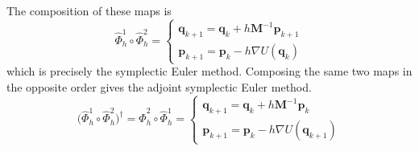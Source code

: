 \documentclass{article}
\theoremstyle{remark}
\theoremstyle{definition}
\begin{document}
The composition of these maps is 
\[\hat{\Phi}_h^1 \circ \hat{\Phi}_h^2 = \begin{cases} 
\mathbf{q}_{k+1} = \mathbf{q}_k + h \mathbf{M}^{-1} \mathbf{p}_{k+1} \\
\mathbf{p}_{k+1} = \mathbf{p}_k - h \nabla U (\mathbf{q}_k) 
\end{cases}\]
which is precisely the symplectic Euler method. Composing the same two maps in the opposite order gives the adjoint symplectic Euler method. 
\[\big(\hat{\Phi}_h^1 \circ \hat{\Phi}_h^2 \big)^\dagger = \hat{\Phi}_h^2 \circ \hat{\Phi}_h^1 = \begin{cases} 
\mathbf{q}_{k+1} = \mathbf{q}_k + h \mathbf{M}^{-1} \mathbf{p}_k \\
\mathbf{p}_{k+1} = \mathbf{p}_k - h \nabla U(\mathbf{q}_{k+1}) 
\end{cases}\]
\end{document}
